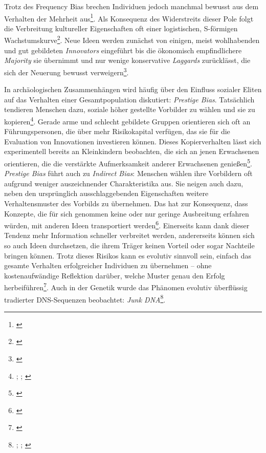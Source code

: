 \documentclass[openany,twoside,twocolumn]{book}
\let\rmarkdownfootnote\footnote%
\def\footnote{\protect\rmarkdownfootnote}
\begin{document}
Trotz des Frequency Bias brechen Individuen jedoch manchmal bewusst aus
dem Verhalten der Mehrheit aus\footnote{\textcite{henrich_evolution_2003}}.
Als Konsequenz des Widerstreits dieser Pole folgt die Verbreitung
kultureller Eigenschaften oft einer logistischen, S-förmigen
Wachstumskurve\footnote{\textcite{henrich_cultural_2001}}. Neue Ideen
werden zunächst von einigen, meist wohlhabenden und gut gebildeten
\emph{Innovators} eingeführt bis die ökonomisch empfindlichere
\emph{Majority} sie übernimmt und nur wenige konservative
\emph{Laggards} zurücklässt, die sich der Neuerung bewusst
verweigern\footnote{\textcite{rogers_diffusion_1983}}.

In archäologischen Zusammenhängen wird häufig über den Einfluss sozialer
Eliten auf das Verhalten einer Gesamtpopulation diskutiert:
\emph{Prestige Bias}. Tatsächlich tendieren Menschen dazu, soziale höher
gestellte Vorbilder zu wählen und sie zu kopieren\footnote{\textcite{barkow_prestige_1975};
  \textcite{henrich_evolution_2001}; \textcite{schlag_why_1998}}. Gerade
arme und schlecht gebildete Gruppen orientieren sich oft an
Führungspersonen, die über mehr Risikokapital verfügen, das sie für die
Evaluation von Innovationen investieren können. Dieses Kopierverhalten
lässt sich experimentell bereits an Kleinkindern beobachten, die sich an
jenen Erwachsenen orientieren, die die verstärkte Aufmerksamkeit anderer
Erwachsenen genießen\footnote{\textcite{chudek_prestige-biased_2012}}.
\emph{Prestige Bias} führt auch zu \emph{Indirect Bias}: Menschen wählen
ihre Vorbildern oft aufgrund weniger auszeichnender Charakteristika aus.
Sie neigen auch dazu, neben den ursprünglich ausschlaggebenden
Eigenschaften weitere Verhaltensmuster des Vorbilds zu übernehmen. Das
hat zur Konsequenz, dass Konzepte, die für sich genommen keine oder nur
geringe Ausbreitung erfahren würden, mit anderen Ideen transportiert
werden\footnote{\textcite{obrien_style_2003}}. Einerseits kann dank
dieser Tendenz mehr Information schneller verbreitet werden,
andererseits können sich so auch Ideen durchsetzen, die ihrem Träger
keinen Vorteil oder sogar Nachteile bringen können. Trotz dieses Risikos
kann es evolutiv sinnvoll sein, einfach das gesamte Verhalten
erfolgreicher Individuen zu übernehmen -- ohne kostenaufwändige
Reflektion darüber, welche Muster genau den Erfolg
herbeiführen\footnote{\textcite{smith_cultural_1992}}. Auch in der
Genetik wurde das Phänomen evolutiv überflüssig tradierter DNS-Sequenzen
beobachtet: \emph{Junk DNA}\footnote{\textcite{doolittle_selfish_1980};
  \textcite{gibbs_unseen_2003}; \textcite{orgel_selfish_1980}}.
\end{document}
